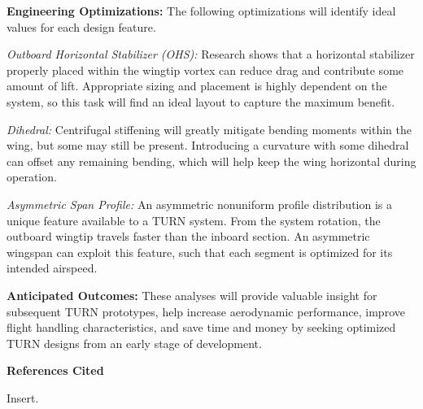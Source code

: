 \documentclass[11pt]{article}
\begin{document}
{\color{green} \bf Engineering Optimizations:}
The following optimizations will identify ideal values for each design feature.

\emph{Outboard Horizontal Stabilizer (OHS):}
Research shows that a horizontal stabilizer properly placed within the wingtip vortex can reduce drag and contribute some amount of lift.  Appropriate sizing and placement is highly dependent on the system, so this task will find an ideal layout to capture the maximum benefit.

\emph{Dihedral:}
Centrifugal stiffening will greatly mitigate bending moments within the wing, but some may still be present.  Introducing a curvature with some dihedral can offset any remaining bending, which will help keep the wing horizontal during operation.

\emph{Asymmetric Span Profile:}
An asymmetric nonuniform profile distribution is a unique feature available to a TURN system.  From the system rotation, the outboard wingtip travels faster than the inboard section.  An asymmetric wingspan can exploit this feature, such that each segment is optimized for its intended airspeed.


{\color{green} \bf Anticipated Outcomes:}
These analyses will provide valuable insight for subsequent TURN prototypes, help increase aerodynamic performance, improve flight handling characteristics, and save time and money by seeking optimized TURN designs from an early stage of development.








\newpage \cfoot{ }
{\color{red} \bf \Huge References Cited}

Insert.
\end{document}
